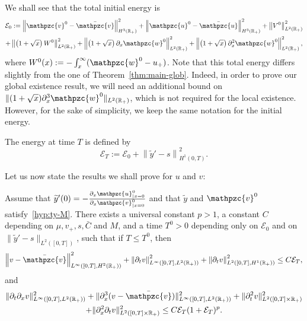 \documentclass[AHL,Unicode,longabstracts,published]{cedram}
\newcommand{\R}{\mathbb{R}}
\newcommand{\p}{\partial}
\newcommand{\bv}{\bar{\mathpzc{v}}}
\newcommand{\bu}{\bar{\mathpzc{u}}}
\newcommand{\cE}{\mathcal E}
\newcommand{\tv}{\mathpzc{v}}
\newcommand{\tu}{\mathpzc{u}}
\newcommand{\tw}{\mathpzc{w}}
\newcommand{\ty}{\widetilde{y}}
\begin{document}
We shall see that the total initial energy is
\begin{multline}\label{def:E0}
\cE_0:=\left\|\tv^0 - \bv\right\|_{H^3(\R_+)}^2 + \left\|\tu^0-\bu\right\|_{H^3(\R_+)}^2 +\left\|V^0\right\|_{L^2(\R_+)}^2 \\
+ \left\|\left(1+\sqrt{x}\right) W^0\right\|_{L^2(\R_+)}^2 + \left\|\left(1+\sqrt{x}\right) \p_x\tw^0\right\|_{L^2(\R_+)}^2 + \left\|\left(1+\sqrt{x}\right)\partial_x^2\tw^0\right\|_{L^2(\R_+)}^2,
\end{multline}
where $W^0(x):=-\int_x^\infty (\tw^0-u_+)$. {Note that this total energy differs slightly from the one of Theorem~\ref{thm:main-glob}. Indeed, in order to prove our global existence result, we will need an additional bound on $\|(1+\sqrt{x})\partial_x^3\tw^0\|_{L^2(\R_+)}$, which is not required for the local existence. However, for the sake of simplicity, we keep the same notation for the initial energy.}


The energy at time $T$ is defined by
\begin{equation}\label{def:ET}
\cE_T:=\cE_0 + \left\|\ty'-s\right\|_{H^1(0,T)}^2.
\end{equation}


Let us now state the results we shall prove for $u$ and $v$:

\begin{prop}\label{cor:recap-est-v}
Assume that $\ty'(0)=-\frac{\p_x \tu^0_{|x=0}}{\p_x \tv^0_{|x=0}}$ and that $\ty$ and $\tv^0$ satisfy~\eqref{hyp:ty-M}. There exists a universal constant $p>1$, a constant $C$ depending on $\mu, v_+, s, \bar C$ and $M$, and a time $T^0>0$ depending only on $\cE_0$ and on $\|\ty'-s\|_{L^2([0,T])}$, such that if $T\leq T^0$, then
\begin{align*}
\left\|v-\bv\right\|_{L^\infty\left([0,T], H^2(\R_+)\right)}^2 + \left\|\p_t v\right\|_{L^\infty\left([0,T], L^2(\R_+)\right)}^2 + \left\|\p_t v\right\|_{L^2\left([0,T], H^1(\R_+)\right)}^2
\leq C \cE_T,
\end{align*}
and
\begin{multline*}
\|\p_t \p_x v\|_{L^\infty([0,T], L^2(\R_+))}^2 + \| \p_x^3(v-\bv)\|_{L^\infty([0,T], L^2(\R_+))}^2 + \| \p_t^2 v\|_{L^2([0,T]\times \R_+)}^2
\\ + \|\p_x^2 \p_t v\|_{L^2([0,T]\times \R_+)}^2
\leq C \cE_T (1+ \cE_T)^p.
\end{multline*}
\end{prop}
\end{document}
